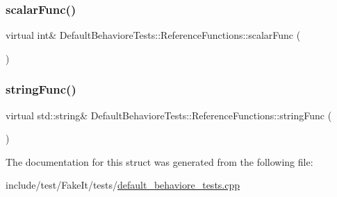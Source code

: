 \subsubsection{\texorpdfstring{scalarFunc()}{scalarFunc()}}
{\footnotesize\ttfamily virtual int\& Default\+Behaviore\+Tests\+::\+Reference\+Functions\+::scalar\+Func (\begin{DoxyParamCaption}{ }\end{DoxyParamCaption})\hspace{0.3cm}{\ttfamily [pure virtual]}}

\mbox{\label{structDefaultBehavioreTests_1_1ReferenceFunctions_a9570c6e84e3e2e0a6805fd26122cceab}} 
\subsubsection{\texorpdfstring{stringFunc()}{stringFunc()}}
{\footnotesize\ttfamily virtual std\+::string\& Default\+Behaviore\+Tests\+::\+Reference\+Functions\+::string\+Func (\begin{DoxyParamCaption}{ }\end{DoxyParamCaption})\hspace{0.3cm}{\ttfamily [pure virtual]}}



The documentation for this struct was generated from the following file\+:\begin{DoxyCompactItemize}
\item 
include/test/\+Fake\+It/tests/\mbox{\hyperlink{default__behaviore__tests_8cpp}{default\+\_\+behaviore\+\_\+tests.\+cpp}}\end{DoxyCompactItemize}
